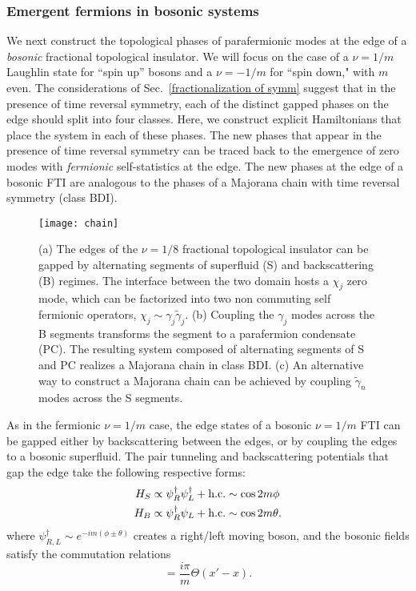\documentclass[twocolumn,aps,prb,showpacs]{revtex4-1}
\begin{document}
\subsubsection{Emergent fermions in bosonic systems}

We next construct the topological phases  of parafermionic modes at the edge of a \emph{bosonic} fractional topological insulator. We will focus on the case of a  $\nu = 1/m$ Laughlin state for ``spin up'' bosons and a $\nu = -1/m$ for ``spin down," with $m$ even. The considerations of Sec.~\ref{fractionalization of symm} suggest that in the presence of time reversal symmetry, each of the distinct gapped phases on the edge should split into four classes. Here, we construct explicit Hamiltonians that place the system in each of these phases. The new phases that appear in the presence of time reversal symmetry can be traced back to the emergence of zero modes with \emph{fermionic} self-statistics at the edge. The new phases at the edge of a bosonic FTI are analogous to the phases of a Majorana chain with time reversal symmetry (class BDI).

\begin{figure}[h]
\texttt{[image: chain]}
\caption{(a) The edges of the $ \nu = 1/8$ fractional topological insulator can be gapped by alternating  segments of superfluid (S) and backscattering (B) regimes. The  interface between the two domain hosts a $\chi_j$ zero mode, which can be factorized into two non commuting  self fermionic operators, $\chi_j\sim \gamma_j\tilde{\gamma}_j$. (b) Coupling the $ \gamma_j$ modes across the B segments transforms the segment to a   parafermion condensate (PC).  The resulting system composed of alternating segments of S and PC realizes a Majorana chain in class BDI. (c) An alternative way to construct a Majorana chain can be achieved  by coupling   $ \tilde{\gamma}_n$ modes across the S segments. }
\label{chain}
\end{figure}

As in the fermionic $\nu = 1/m$ case, the edge states of a bosonic $\nu = 1/m$ FTI can be gapped either by backscattering between the edges, or by coupling the edges to a bosonic superfluid.
The pair tunneling and  backscattering potentials that gap the edge take the following respective forms:
\begin{align}
H_{S} &\propto  \psi_R^\dag \psi_L^\dag +{\rm h.c.} \sim \cos 2m \phi\\
H_{B} &\propto \psi_R^\dag \psi_L +{\rm h.c.} \sim \cos 2m \theta.
\end{align}
where  $ \psi_{R,L}^\dag \sim  e^{-im (\phi\pm \theta)} $ creates a right/left moving boson, and the bosonic fields satisfy the commutation relations
\begin{equation}
[\phi(x),\theta(x')]=\frac{i\pi}{m}\Theta(x'-x).
\end{equation}
\end{document}
